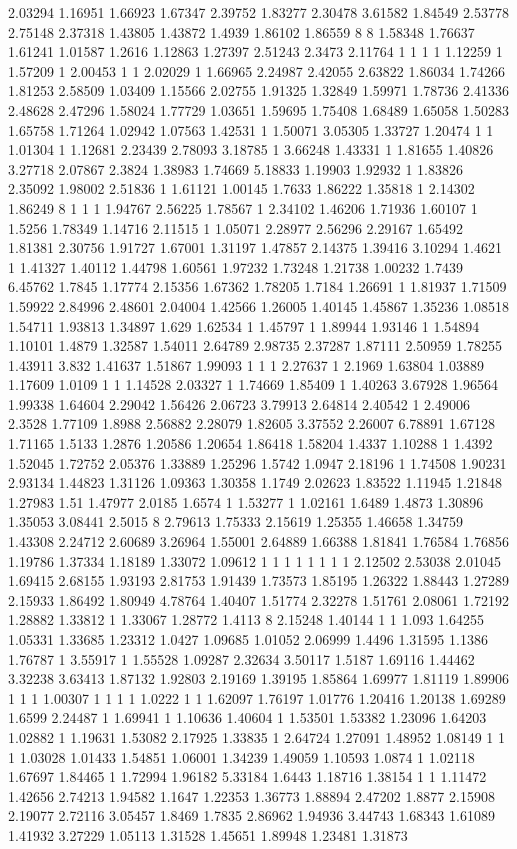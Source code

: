 2.03294 1.16951 1.66923 1.67347 2.39752 1.83277 2.30478 3.61582 1.84549 2.53778 2.75148 2.37318 1.43805 1.43872 1.4939 1.86102 1.86559 8 8 1.58348 1.76637 1.61241 1.01587 1.2616 1.12863 1.27397 2.51243 2.3473 2.11764 1 1 1 1 1.12259 1 1.57209 1 2.00453 1 1 2.02029 1 1.66965 2.24987 2.42055 2.63822 1.86034 1.74266 1.81253 2.58509 1.03409 1.15566 2.02755 1.91325 1.32849 1.59971 1.78736 2.41336 2.48628 2.47296 1.58024 1.77729 1.03651 1.59695 1.75408 1.68489 1.65058 1.50283 1.65758 1.71264 1.02942 1.07563 1.42531 1 1.50071 3.05305 1.33727 1.20474 1 1 1.01304 1 1.12681 2.23439 2.78093 3.18785 1 3.66248 1.43331 1 1.81655 1.40826 3.27718 2.07867 2.3824 1.38983 1.74669 5.18833 1.19903 1.92932 1 1.83826 2.35092 1.98002 2.51836 1 1.61121 1.00145 1.7633 1.86222 1.35818 1 2.14302 1.86249 8 1 1 1 1.94767 2.56225 1.78567 1 2.34102 1.46206 1.71936 1.60107 1 1.5256 1.78349 1.14716 2.11515 1 1.05071 2.28977 2.56296 2.29167 1.65492 1.81381 2.30756 1.91727 1.67001 1.31197 1.47857 2.14375 1.39416 3.10294 1.4621 1 1.41327 1.40112 1.44798 1.60561 1.97232 1.73248 1.21738 1.00232 1.7439 6.45762 1.7845 1.17774 2.15356 1.67362 1.78205 1.7184 1.26691 1 1.81937 1.71509 1.59922 2.84996 2.48601 2.04004 1.42566 1.26005 1.40145 1.45867 1.35236 1.08518 1.54711 1.93813 1.34897 1.629 1.62534 1 1.45797 1 1.89944 1.93146 1 1.54894 1.10101 1.4879 1.32587 1.54011 2.64789 2.98735 2.37287 1.87111 2.50959 1.78255 1.43911 3.832 1.41637 1.51867 1.99093 1 1 1 2.27637 1 2.1969 1.63804 1.03889 1.17609 1.0109 1 1 1.14528 2.03327 1 1.74669 1.85409 1 1.40263 3.67928 1.96564 1.99338 1.64604 2.29042 1.56426 2.06723 3.79913 2.64814 2.40542 1 2.49006 2.3528 1.77109 1.8988 2.56882 2.28079 1.82605 3.37552 2.26007 6.78891 1.67128 1.71165 1.5133 1.2876 1.20586 1.20654 1.86418 1.58204 1.4337 1.10288 1 1.4392 1.52045 1.72752 2.05376 1.33889 1.25296 1.5742 1.0947 2.18196 1 1.74508 1.90231 2.93134 1.44823 1.31126 1.09363 1.30358 1.1749 2.02623 1.83522 1.11945 1.21848 1.27983 1.51 1.47977 2.0185 1.6574 1 1.53277 1 1.02161 1.6489 1.4873 1.30896 1.35053 3.08441 2.5015 8 2.79613 1.75333 2.15619 1.25355 1.46658 1.34759 1.43308 2.24712 2.60689 3.26964 1.55001 2.64889 1.66388 1.81841 1.76584 1.76856 1.19786 1.37334 1.18189 1.33072 1.09612 1 1 1 1 1 1 1 1 2.12502 2.53038 2.01045 1.69415 2.68155 1.93193 2.81753 1.91439 1.73573 1.85195 1.26322 1.88443 1.27289 2.15933 1.86492 1.80949 4.78764 1.40407 1.51774 2.32278 1.51761 2.08061 1.72192 1.28882 1.33812 1 1.33067 1.28772 1.4113 8 2.15248 1.40144 1 1 1.093 1.64255 1.05331 1.33685 1.23312 1.0427 1.09685 1.01052 2.06999 1.4496 1.31595 1.1386 1.76787 1 3.55917 1 1.55528 1.09287 2.32634 3.50117 1.5187 1.69116 1.44462 3.32238 3.63413 1.87132 1.92803 2.19169 1.39195 1.85864 1.69977 1.81119 1.89906 1 1 1 1.00307 1 1 1 1 1.0222 1 1 1.62097 1.76197 1.01776 1.20416 1.20138 1.69289 1.6599 2.24487 1 1.69941 1 1.10636 1.40604 1 1.53501 1.53382 1.23096 1.64203 1.02882 1 1.19631 1.53082 2.17925 1.33835 1 2.64724 1.27091 1.48952 1.08149 1 1 1 1.03028 1.01433 1.54851 1.06001 1.34239 1.49059 1.10593 1.0874 1 1.02118 1.67697 1.84465 1 1.72994 1.96182 5.33184 1.6443 1.18716 1.38154 1 1 1.11472 1.42656 2.74213 1.94582 1.1647 1.22353 1.36773 1.88894 2.47202 1.8877 2.15908 2.19077 2.72116 3.05457 1.8469 1.7835 2.86962 1.94936 3.44743 1.68343 1.61089 1.41932 3.27229 1.05113 1.31528 1.45651 1.89948 1.23481 1.31873 